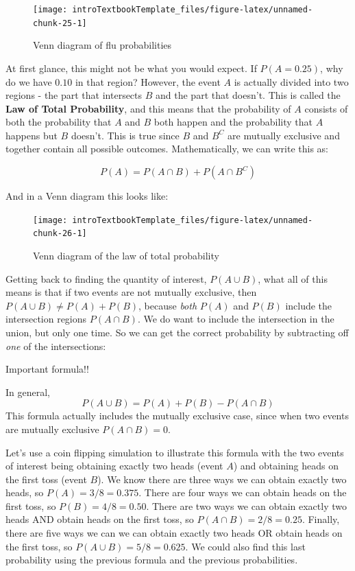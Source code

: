 \documentclass[
]{book}
\theoremstyle{definition}
\theoremstyle{definition}
\theoremstyle{definition}
\theoremstyle{remark}
\begin{document}
\begin{figure}

{\centering \texttt{[image: introTextbookTemplate\_files/figure-latex/unnamed-chunk-25-1]} 

}

\caption{Venn diagram of flu probabilities}\label{fig:unnamed-chunk-25}
\end{figure}

At first glance, this might not be what you would expect. If \(P(A = 0.25)\), why do we have \(0.10\) in that region? However, the event \(A\) is actually divided into two regions - the part that intersects \(B\) and the part that doesn't. This is called the \textbf{Law of Total Probability}, and this means that the probability of \(A\) consists of both the probability that \(A\) and \(B\) both happen and the probability that \(A\) happens but \(B\) doesn't. This is true since \(B\) and \(B^C\) are mutually exclusive and together contain all possible outcomes. Mathematically, we can write this as:

\[P(A) = P(A \cap B) + P(A \cap B^C)\]

And in a Venn diagram this looks like:

\begin{figure}

{\centering \texttt{[image: introTextbookTemplate\_files/figure-latex/unnamed-chunk-26-1]} 

}

\caption{Venn diagram of the law of total probability}\label{fig:unnamed-chunk-26}
\end{figure}

Getting back to finding the quantity of interest, \(P(A \cup B)\), what all of this means is that if two events are not mutually exclusive, then \(P(A \cup B) \neq P(A) + P(B)\), because \emph{both} \(P(A)\) and \(P(B)\) include the intersection regions \(P(A \cap B)\). We do want to include the intersection in the union, but only one time. So we can get the correct probability by subtracting off \emph{one} of the intersections:

Important formula!!

In general,
\[P(A \cup B) = P(A) + P(B) - P(A \cap B)\]
This formula actually includes the mutually exclusive case, since when two events are mutually exclusive \(P(A \cap B) = 0\).

Let's use a coin flipping simulation to illustrate this formula with the two events of interest being obtaining exactly two heads (event \(A\)) and obtaining heads on the first toss (event \(B\)). We know there are three ways we can obtain exactly two heads, so \(P(A) = 3/8 = 0.375\). There are four ways we can obtain heads on the first toss, so \(P(B) = 4/8 = 0.50\). There are two ways we can obtain exactly two heads AND obtain heads on the first toss, so \(P(A \cap B) = 2/8 = 0.25\). Finally, there are five ways we can we can obtain exactly two heads OR obtain heads on the first toss, so \(P(A \cup B) = 5/8 = 0.625\). We could also find this last probability using the previous formula and the previous probabilities.
\end{document}
